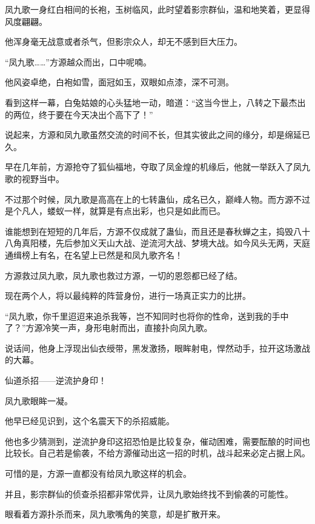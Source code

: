
\begin{this_body}



凤九歌一身红白相间的长袍，玉树临风，此时望着影宗群仙，温和地笑着，更显得风度翩翩。

他浑身毫无战意或者杀气，但影宗众人，却无不感到巨大压力。

“凤九歌……”方源越众而出，口中呢喃。

他风姿卓绝，白袍如雪，面冠如玉，双眼如点漆，深不可测。

看到这样一幕，白兔姑娘的心头猛地一动，暗道：“这当今世上，八转之下最杰出的两位，终于要在今天决出个高下了！”

说起来，方源和凤九歌虽然交流的时间不长，但其实彼此之间的缘分，却是绵延已久。

早在几年前，方源抢夺了狐仙福地，夺取了凤金煌的机缘后，他就一举跃入了凤九歌的视野当中。

不过那个时候，凤九歌是高高在上的七转蛊仙，成名已久，巅峰人物。而方源不过是个凡人，蝼蚁一样，就算是有点出彩，也只是如此而已。

谁能想到在短短的几年后，方源不仅成就了蛊仙，而且还是春秋蝉之主，捣毁八十八角真阳楼，先后参加义天山大战、逆流河大战、梦境大战。如今风头无两，天庭通缉榜上有名，在名望上已然是和凤九歌齐名！

方源救过凤九歌，凤九歌也救过方源，一切的恩怨都已经了结。

现在两个人，将以最纯粹的阵营身份，进行一场真正实力的比拼。

“凤九歌，你千里迢迢来追杀我等，岂不知同时也将你的性命，送到我的手中了？”方源冷笑一声，身形电射而出，直接扑向凤九歌。

说话间，他身上浮现出仙衣绶带，黑发激扬，眼眸射电，悍然动手，拉开这场激战的大幕。

仙道杀招——逆流护身印！

凤九歌眼眸一凝。

他早已经见识到，这个名震天下的杀招威能。

他也多少猜测到，逆流护身印这招恐怕是比较复杂，催动困难，需要酝酿的时间也比较长。自己若是偷袭，不给方源催动出这一招的时机，战斗起来必定占据上风。

可惜的是，方源一直都没有给凤九歌这样的机会。

并且，影宗群仙的侦查杀招都非常优异，让凤九歌始终找不到偷袭的可能性。

眼看着方源扑杀而来，凤九歌嘴角的笑意，却是扩散开来。


\end{this_body}

